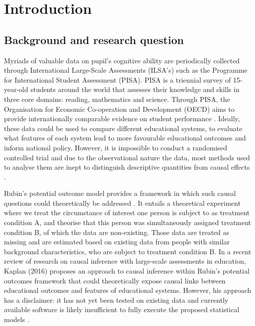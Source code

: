 \documentclass{article}
\begin{document}



\newpage
\section{Introduction}
\subsection{Background and research question}

Myriads of valuable data on pupil's cognitive ability are periodically collected through International Large-Scale Assessments (ILSA's) such as the Programme for International Student Assessment (PISA). PISA is a triennial survey of 15-year-old students around the world that assesses their knowledge and skills in three core domains: reading, mathematics and science. Through PISA, the Organisation for Economic Co-operation and Development (OECD) aims to provide internationally comparable evidence on student performance \parencite{oecd_pisa_2020}. Ideally, these data could be used to compare different educational systems, to evaluate what features of each system lead to more favourable educational outcomes and inform national policy. However, it is impossible to conduct a randomised controlled trial and due to the observational nature the data, most methods used to analyse them are inept to distinguish descriptive quantities from causal effects \parencite{rubin_potential_2004}.


Rubin's potential outcome model provides a framework in which such causal questions could theoretically be addressed \parencite{rubin_potential_2004}. It entails a theoretical experiment where we treat the circumstance of interest one person is subject to as treatment condition A, and theorise that this person was simultaneously assigned treatment condition B, of which the data are non-existing. Those data are treated as missing and are estimated based on existing data from people with similar background characteristics, who are subject to treatment condition B. In a recent review of research on causal inference with large-scale assessments in education, Kaplan (2016) proposes an approach to causal inference within Rubin's potential outcomes framework that could theoretically expose causal links between educational outcomes and features of educational systems. However, his approach has a disclaimer: it has not yet been tested on existing data and currently available software is likely insufficient to fully execute the proposed statistical models \parencite{kaplan_causal_2016}.
\end{document}
